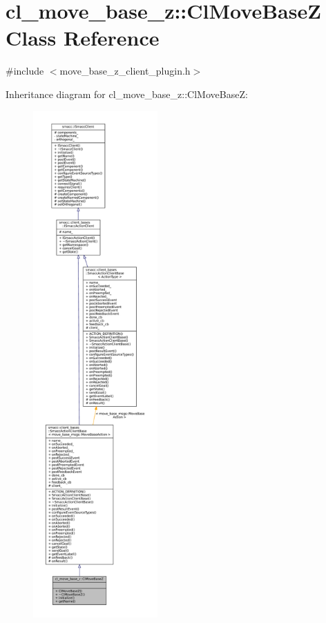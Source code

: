 \hypertarget{classcl__move__base__z_1_1ClMoveBaseZ}{}\section{cl\+\_\+move\+\_\+base\+\_\+z\+:\+:Cl\+Move\+BaseZ Class Reference}
\label{classcl__move__base__z_1_1ClMoveBaseZ}


{\ttfamily \#include $<$move\+\_\+base\+\_\+z\+\_\+client\+\_\+plugin.\+h$>$}



Inheritance diagram for cl\+\_\+move\+\_\+base\+\_\+z\+:\+:Cl\+Move\+BaseZ\+:
\nopagebreak
\begin{figure}[H]
\begin{center}
\leavevmode
\includegraphics[height=550pt]{classcl__move__base__z_1_1ClMoveBaseZ__inherit__graph}
\end{center}
\end{figure}


